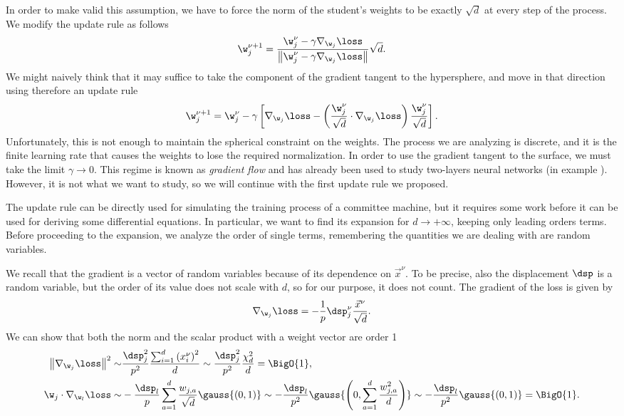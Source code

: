 In order to make valid this assumption, we have to force the norm of the student's weights to be
exactly \(\sqrt{d}\) at every step of the process. We modify the update rule as follows
\[ \w^{\nu+1}_j =\frac{\w^{\nu}_j - \gamma \nabla_{\w_j}{\loss}}{\left\|\w^{\nu}_j - \gamma \nabla_{\w_j}{\loss}\right\|}\sqrt{d}.\]
We might naively think that it may suffice to take the component of the gradient tangent to the hypersphere,
and move in that direction using therefore an update rule
\[
  \w^{\nu+1}_j = \w^{\nu}_j - \gamma \left[
    \nabla_{\w_j}{\loss} - \left(\frac{\w^{\nu}_j}{\sqrt{d}}\cdot\nabla_{\w_j}{\loss}\right)\frac{\w^{\nu}_j}{\sqrt{d}}
  \right].
\]
Unfortunately, this is not enough to maintain the spherical constraint on the weights.
The process we are analyzing is discrete, and it is the finite learning rate that causes the weights to lose the required normalization.
In order to use the gradient tangent to the surface, we must take the limit \(\gamma\to0\).
This regime is known as \emph{gradient flow} and has already been used to study two-layers neural networks (in example \cite{chizat2018global}).
However, it is not what we want to study, so we will continue with the first update rule we proposed.

The update rule can be directly used for simulating the training process of a committee
machine, but it requires some work before it can be used for deriving some differential equations.
In particular, we want to find its expansion for \(d\to+\infty\), keeping only leading orders terms.
Before proceeding to the expansion, we analyze the order of single terms,
remembering the quantities we are dealing with are random variables.

We recall that the gradient is a vector of random variables because of its dependence on \(\vec{x}^\nu\).
To be precise, also the displacement \(\dsp\) is a random variable, but the order of its value does not scale with \(d\),
so for our purpose, it does not count. The gradient of the loss is given by
\[\nabla_{\w_j}{\loss} = -\frac{1}{p}\dsp^\nu_j \frac{\vec{x}^\nu}{\sqrt{d}}.\]
We can show that both the norm and the scalar product with a weight vector are order 1
\[\begin{split}
  \left\|\nabla_{\w_j}{\loss}\right\|^2 \sim&
    \frac{\dsp^2_j}{p^2} \frac{\sum_{i=1}^d \left(x^\nu_i\right)^2}{d}\sim
    \frac{\dsp^2_j}{p^2}\frac{\chi^2_d}{d} = \BigO{1},\\
  \w_j\cdot\nabla_{\w_l}{\loss} \sim&
    -\frac{\dsp_l}{p}\sum_{a=1}^d\frac{w_{j,a}}{\sqrt{d}}\gauss{(0,1)} \sim
    -\frac{\dsp_l}{p^2}\gauss{\left(0,\sum_{a=1}^d\frac{w^2_{j,a}}{d}\right)} \sim
    -\frac{\dsp_l}{p^2}\gauss{\left(0,1\right)}= \BigO{1}.
\end{split}\]


